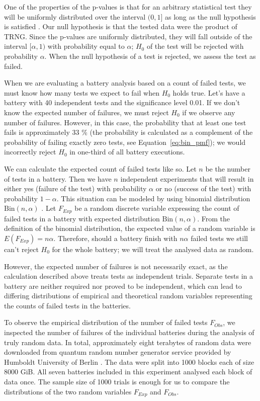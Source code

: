 \documentclass[
	digital,    %
	oneside,    %
	color,
	11pt,
	nocover,
	notable,
	nolof,
	nolot,
]{fithesis3}
\theoremstyle{definition}
\theoremstyle{remark}
\begin{document}
One of the properties of the p-values is that for an arbitrary statistical test they will be uniformly distributed over the interval $(0,1]$ as long as the null hypothesis is satisfied \cite{pvals-uniformity}. Our null hypothesis is that the tested data were the product of TRNG. Since the p-values are uniformly distributed, they will fall outside of the interval $[\alpha, 1)$ with probability equal to $\alpha$; $H_0$ of the test will be rejected with probability $\alpha$. When the null hypothesis of a test is rejected, we assess the test as failed.

When we are evaluating a battery analysis based on a count of failed tests, we must know how many tests we expect to fail when $H_0$ holds true. Let's have a battery with 40 independent tests and the significance level 0.01. If we don't know the expected number of failures, we must reject $H_0$ if we observe any number of failures. However, in this case, the probability that at least one test fails is approximately 33 \% (the probability is calculated as a complement of the probability of failing exactly zero tests, see Equation~\ref{eq:bin_pmf}); we would incorrectly reject $H_0$ in one-third of all battery executions.

We can calculate the expected count of failed tests like so. Let $n$ be the number of tests in a battery. Then we have $n$ independent experiments that will result in either yes (failure of the test) with probability $\alpha$ or no (success of the test) with probability $1-\alpha$. This situation can be modeled by using binomial distribution $\text{Bin}(n, \alpha)$ \cite[p.~245]{stat-handbook}. Let $F_{Exp}$ be a random discrete variable expressing the count of failed tests in a battery with expected distribution $\text{Bin}(n, \alpha)$. From the definition of the binomial distribution, the expected value of a random variable is $E(F_{Exp}) = n\alpha$. Therefore, should a battery finish with $n\alpha$ failed tests we still can't reject $H_0$ for the whole battery; we will treat the analysed data as random.

However, the expected number of failures is not necessarily exact, as the calculation described above treats tests as independent trials. Separate tests in a battery are neither required nor proved to be independent, which can lead to differing distributions of empirical and theoretical random variables representing the counts of failed tests in the batteries.

To observe the empirical distribution of the number of failed tests $F_{Obs}$, we inspected the number of failures of the individual batteries during the analysis of truly random data. In total, approximately eight terabytes of random data were downloaded from quantum random number generator service provided by Humboldt University of Berlin \cite{qrng-service-germany}. The data were split into 1000 blocks each of size 8000 GiB. All seven batteries included in this experiment analysed each block of data once. The sample size of 1000 trials is enough for us to compare the distributions of the two random variables $F_{Exp}$ and $F_{Obs}$.
\end{document}
